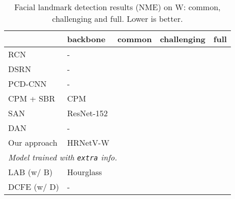 \documentclass[10pt,twocolumn,letterpaper]{article}
\begin{document}
\renewcommand{\arraystretch}{1.3}
\begin{table}[t]
\setlength{\tabcolsep}{6.2pt}
\centering
\scriptsize
\caption{Facial landmark detection results (NME)
on W:
common, challenging and full.
Lower is better.}

\label{table:comparison_300w_fullset}
\begin{tabular}{ l|l|ccc  }
\hline\noalign{\smallskip}
  & backbone &common & challenging & full \\
\hline

\hline
RCN \cite{HonariYVP16} &-&  &  & \\
DSRN \cite{MiaoZLDAH18} &-&  &  &  \\
PCD-CNN \cite{KumarC18} &-&  &  &  \\
CPM + SBR \cite{DongYWW0S18} & CPM &  &  &  \\
SAN \cite{DongYO018} &ResNet-152&  &  &  \\
DAN \cite{KowalskiNT17} &-&  &  &  \\
\hline
Our approach & HRNetV-W & &  & \\
\hline

\hline
\multicolumn{3}{l}{
\emph {Model trained with \texttt{extra} info.}}\\
\hline
LAB (w/ B) \cite{Wu0YWC018}& Hourglass &  &  &  \\
DCFE (w/ D) \cite{ValleBVB18}& - & &  &  \\
\hline
\end{tabular}
\end{table}
\end{document}
